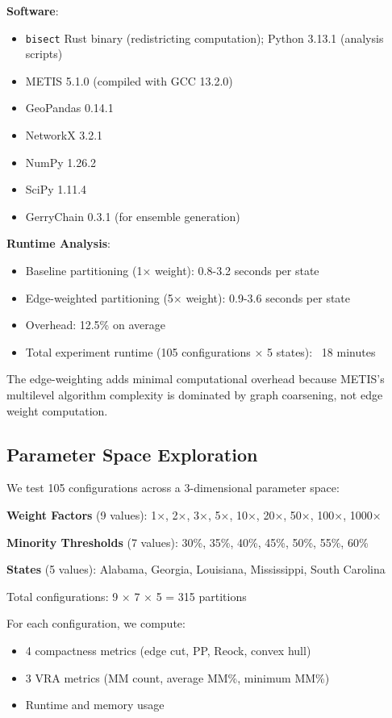 {\textbf{Software}:
\begin{itemize}
    \item \texttt{bisect} Rust binary (redistricting computation); Python 3.13.1 (analysis scripts)
    \item METIS 5.1.0 (compiled with GCC 13.2.0)
    \item GeoPandas 0.14.1
    \item NetworkX 3.2.1
    \item NumPy 1.26.2
    \item SciPy 1.11.4
    \item GerryChain 0.3.1 (for ensemble generation)
\end{itemize}

\textbf{Runtime Analysis}:
\begin{itemize}
    \item Baseline partitioning (1× weight): 0.8-3.2 seconds per state
    \item Edge-weighted partitioning (5× weight): 0.9-3.6 seconds per state
    \item Overhead: 12.5\% on average
    \item Total experiment runtime (105 configurations × 5 states): ~18 minutes
\end{itemize}

The edge-weighting adds minimal computational overhead because METIS's multilevel algorithm complexity is dominated by graph coarsening, not edge weight computation.

\subsection{Parameter Space Exploration}

We test 105 configurations across a 3-dimensional parameter space:

\textbf{Weight Factors} (9 values): 1×, 2×, 3×, 5×, 10×, 20×, 50×, 100×, 1000×

\textbf{Minority Thresholds} (7 values): 30\%, 35\%, 40\%, 45\%, 50\%, 55\%, 60\%

\textbf{States} (5 values): Alabama, Georgia, Louisiana, Mississippi, South Carolina

Total configurations: 9 × 7 × 5 = 315 partitions

For each configuration, we compute:
\begin{itemize}
    \item 4 compactness metrics (edge cut, PP, Reock, convex hull)
    \item 3 VRA metrics (MM count, average MM\%, minimum MM\%)
    \item Runtime and memory usage
\end{itemize}

}
